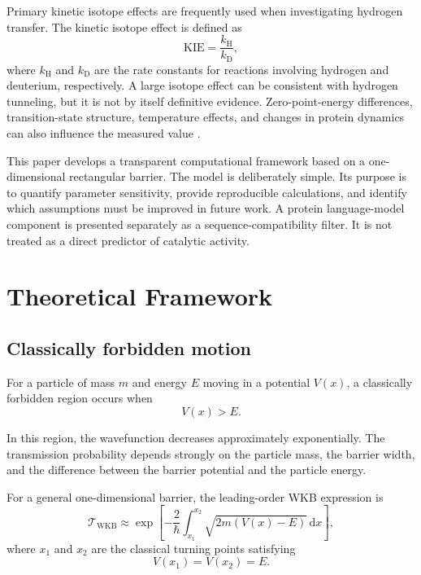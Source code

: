 \documentclass[11pt,a4paper]{article}
\newcommand{\WKB}{\mathrm{WKB}}
\newcommand{\KIE}{\mathrm{KIE}}
\newcommand{\trans}{\mathcal{T}}
\begin{document}
Primary kinetic isotope effects are frequently used when investigating
hydrogen transfer. The kinetic isotope effect is defined as
\begin{equation}
\KIE =
\frac{k_{\mathrm{H}}}{k_{\mathrm{D}}},
\label{eq:kie}
\end{equation}
where $k_{\mathrm{H}}$ and $k_{\mathrm{D}}$ are the rate constants for reactions
involving hydrogen and deuterium, respectively. A large isotope effect can be
consistent with hydrogen tunneling, but it is not by itself definitive evidence.
Zero-point-energy differences, transition-state structure, temperature effects,
and changes in protein dynamics can also influence the measured value
\cite{klinman2013,meyer2005}.

This paper develops a transparent computational framework based on a
one-dimensional rectangular barrier. The model is deliberately simple. Its
purpose is to quantify parameter sensitivity, provide reproducible calculations,
and identify which assumptions must be improved in future work. A protein
language-model component is presented separately as a sequence-compatibility
filter. It is not treated as a direct predictor of catalytic activity.

\section{Theoretical Framework}

\subsection{Classically forbidden motion}

For a particle of mass $m$ and energy $E$ moving in a potential $V(x)$, a
classically forbidden region occurs when
\begin{equation}
V(x)>E.
\end{equation}

In this region, the wavefunction decreases approximately exponentially. The
transmission probability depends strongly on the particle mass, the barrier
width, and the difference between the barrier potential and the particle
energy.

For a general one-dimensional barrier, the leading-order WKB expression is
\begin{equation}
\trans_{\WKB}
\approx
\exp\left[
-\frac{2}{\hbar}
\int_{x_1}^{x_2}
\sqrt{2m\left(V(x)-E\right)}
\,\mathrm{d}x
\right],
\label{eq:general_wkb}
\end{equation}
where $x_1$ and $x_2$ are the classical turning points satisfying
\[
V(x_1)=V(x_2)=E.
\]
\end{document}
